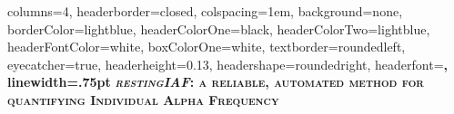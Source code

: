 \documentclass[landscape,a0paper,fontscale=.235]{xebaposter} %
\begin{document}
\begin{poster}
{
columns=4, %
headerborder=closed, %
colspacing=1em, %
background=none, %
borderColor=lightblue, %
headerColorOne=black, %
headerColorTwo=lightblue, %
headerFontColor=white, %
boxColorOne=white, %
textborder=roundedleft, %
eyecatcher=true, %
headerheight=0.13\textheight, %
headershape=roundedright, %
headerfont=\Large\bf\textsc, %
linewidth=.75pt %
}
{
\setlength\fboxsep{0pt}
\setlength\fboxrule{0pt}
}
{\bf\textsc{\emph{restingIAF}: a reliable, automated method for quantifying Individual Alpha Frequency}\vspace{.2em}} %

\end{poster}
\end{document}
